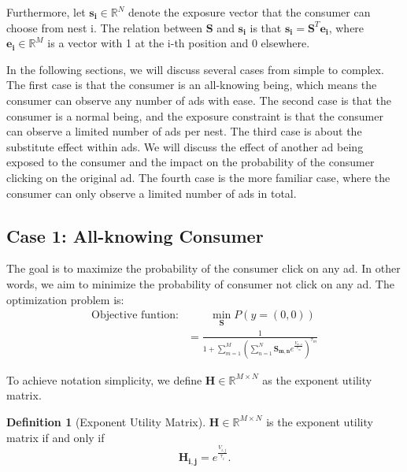 \documentclass[12pt]{article}
\theoremstyle{definition}
\newtheorem{definition}{Definition}[section]
\newcommand{\matr}[1]{\mathbf{#1}} %
\begin{document}
\begin{sloppypar}
Furthermore, let $\matr{s_i} \in \mathbb{R}^{N}$ denote the exposure vector that the consumer can choose from nest i. The relation between $\matr{S}$ and $\matr{s_i}$ is that $\matr{s_i} = \matr{S}^T \matr{e_i}$, where $\matr{e_i} \in \mathbb{R}^{M}$ is a vector with 1 at the i-th position and 0 elsewhere.

In the following sections, we will discuss several cases from simple to complex. The first case is that the consumer is an all-knowing being, which means the consumer can observe any number of ads with ease. The second case is that the consumer is a normal being, and the exposure constraint is that the consumer can observe a limited number of ads per nest. The third case is about the substitute effect within ads. We will discuss the effect of another ad being exposed to the consumer and the impact on the probability of the consumer clicking on the original ad. The fourth case is the more familiar case, where the consumer can only observe a limited number of ads in total.

\subsection{Case 1: All-knowing Consumer}
The goal is to maximize the probability of the consumer click on any ad. In other words, we aim to minimize the probability of consumer not click on any ad. The optimization problem is:
\begin{align}
    \text{Objective funtion:} &\qquad \min_{\matr{S}} P(y=(0,0)) \nonumber \\
    &= \frac{1}{1+\sum_{m=1}^{M}(\sum_{n=1}^{N} \matr{S_{m,n}}e^\frac{{V_{m,n}}}{\tau_m})^{\tau_m}}
\end{align}

To achieve notation simplicity, we define $\matr{H} \in \mathbb{R}^{M \times N}$ as the exponent utility matrix.
\begin{definition}[Exponent Utility Matrix]\label{exponent}
    $\matr{H} \in \mathbb{R}^{M \times N}$ is the exponent utility matrix if and only if 
    \begin{equation*}
        \matr{H_{i,j}} = e^\frac{{V_{i,j}}}{\tau_i}.
    \end{equation*}
\end{definition}


\end{sloppypar}
\end{document}
